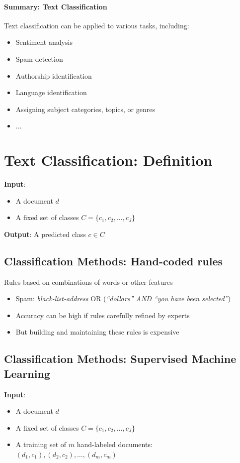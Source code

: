 \paragraph{Summary: Text Classification}
    Text classification can be applied to various tasks, including:
    \begin{itemize}
        \item Sentiment analysis
        \item Spam detection
        \item Authorship identification
        \item Language identification
        \item Assigning subject categories, topics, or genres
        \item ...
    \end{itemize}


\section{Text Classification: Definition}
    \textbf{Input}:
    \begin{itemize}
        \item A document $d$
        \item A fixed set of classes $C = \{c_1, c_2, \ldots, c_J\}$
    \end{itemize}
    
    \textbf{Output}: A predicted class $c \in C$


\subsection{Classification Methods: Hand-coded rules}
    Rules based on combinations of words or other features
    \begin{itemize}
        \item Spam: \textit{black-list-address} OR (\textit{“dollars” AND “you have been selected”})
        \item Accuracy can be high if rules carefully refined by experts
        \item But building and maintaining these rules is expensive
    \end{itemize}

\subsection{Classification Methods: Supervised Machine Learning}
    \textbf{Input}:
    \begin{itemize}
        \item A document $d$
        \item A fixed set of classes $C = \{c_1, c_2, \ldots, c_J\}$
        \item A training set of $m$ hand-labeled documents: $(d_1, c_1), (d_2, c_2), \ldots, (d_m, c_m)$
    \end{itemize}
    
